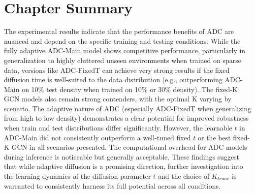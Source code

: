 \begin{comment}
\subsection{Training Time}
\label{subsec:training_time_detailed}
*(Training time is not in b.txt. This table needs manual data or to be described qualitatively.)*
\begin{table}[htbp]
    \centering
    \caption{Approximate Total Training Time (hours) for 100 Epochs}
    \label{tab:training_time_detailed}
    \begin{tabular}{lc}
        \toprule
        Method & Training Time (hours) \\
        \midrule
        Fixed-K GNN (Avg. K=1 to 4) & ~[Value] \\
        \midrule
        ADC-MRPP ($K_{trunc}$=10) & ~[Value] \\
        \bottomrule
    \end{tabular}
\end{table}
ADC introduces a [modest/significant] increase in training time (Table \ref{tab:training_time_detailed}) due to the computation of diffusion coefficients and potentially a more complex loss landscape for the parameter $t$.
\end{comment}

\section{Chapter Summary}
\label{sec:results_summary_detailed}
The experimental results indicate that the performance benefits of ADC are nuanced and depend on the specific training and testing conditions. While the fully adaptive ADC-Main model shows competitive performance, particularly in generalization to highly cluttered unseen environments when trained on sparse data, versions like ADC-FixedT can achieve very strong results if the fixed diffusion time is well-suited to the data distribution (e.g., outperforming ADC-Main on 10\% test density when trained on 10\% or 30\% density). The fixed-K GCN models also remain strong contenders, with the optimal K varying by scenario. The adaptive nature of ADC (especially ADC-FixedT when generalizing from high to low density) demonstrates a clear potential for improved robustness when train and test distributions differ significantly. However, the learnable $t$ in ADC-Main did not consistently outperform a well-tuned fixed $t$ or the best fixed-K GCN in all scenarios presented. The computational overhead for ADC models during inference is noticeable but generally acceptable. These findings suggest that while adaptive diffusion is a promising direction, further investigation into the learning dynamics of the diffusion parameter $t$ and the choice of $K_{trunc}$ is warranted to consistently harness its full potential across all conditions.
